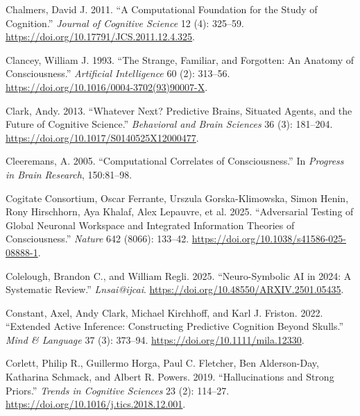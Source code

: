 \documentclass[
  a4paper]{article}
\newlength{\cslhangindent}
\newenvironment{CSLReferences}[2] %
 {\begin{list}{}{%
  \setlength{\itemindent}{0pt}
  \setlength{\leftmargin}{0pt}
  \setlength{\parsep}{0pt}
  \ifodd #1
   \setlength{\leftmargin}{\cslhangindent}
   \setlength{\itemindent}{-1\cslhangindent}
  \fi
  \setlength{\itemsep}{#2\baselineskip}}}
 {\end{list}}
\begin{document}
\begin{CSLReferences}{1}{0}
Chalmers, David J. 2011. {``A Computational Foundation for the Study of
Cognition.''} \emph{Journal of Cognitive Science} 12 (4): 325--59.
\url{https://doi.org/10.17791/JCS.2011.12.4.325}.

Clancey, William J. 1993. {``The Strange, Familiar, and Forgotten: An
Anatomy of Consciousness.''} \emph{Artificial Intelligence} 60 (2):
313--56. \url{https://doi.org/10.1016/0004-3702(93)90007-X}.

Clark, Andy. 2013. {``Whatever Next? {Predictive} Brains, Situated
Agents, and the Future of Cognitive Science.''} \emph{Behavioral and
Brain Sciences} 36 (3): 181--204.
\url{https://doi.org/10.1017/S0140525X12000477}.

Cleeremans, A. 2005. {``Computational Correlates of Consciousness.''} In
\emph{Progress in {Brain Research}}, 150:81--98.

Cogitate Consortium, Oscar Ferrante, Urszula Gorska-Klimowska, Simon
Henin, Rony Hirschhorn, Aya Khalaf, Alex Lepauvre, et al. 2025.
{``Adversarial Testing of Global Neuronal Workspace and Integrated
Information Theories of Consciousness.''} \emph{Nature} 642 (8066):
133--42. \url{https://doi.org/10.1038/s41586-025-08888-1}.

Colelough, Brandon C., and William Regli. 2025. {``Neuro-Symbolic {AI}
in 2024: A Systematic Review.''} \emph{Lnsai@ijcai}.
\url{https://doi.org/10.48550/ARXIV.2501.05435}.

Constant, Axel, Andy Clark, Michael Kirchhoff, and Karl J. Friston.
2022. {``Extended Active Inference: Constructing Predictive Cognition
Beyond Skulls.''} \emph{Mind \& Language} 37 (3): 373--94.
\url{https://doi.org/10.1111/mila.12330}.

Corlett, Philip R., Guillermo Horga, Paul C. Fletcher, Ben Alderson-Day,
Katharina Schmack, and Albert R. Powers. 2019. {``Hallucinations and
Strong Priors.''} \emph{Trends in Cognitive Sciences} 23 (2): 114--27.
\url{https://doi.org/10.1016/j.tics.2018.12.001}.


\end{CSLReferences}
\end{document}
